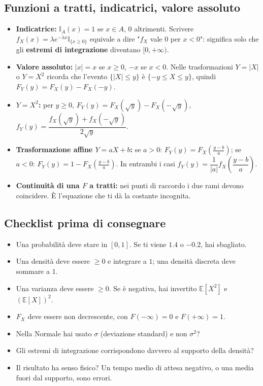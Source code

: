 \documentclass[12pt]{extarticle} %
\begin{document}
\subsection{Funzioni a tratti, indicatrici, valore assoluto}
\begin{itemize}
    \item \textbf{Indicatrice:} $\mathbb{I}_A(x) = 1$ se $x\in A$, $0$ altrimenti. Scrivere $f_X(x)=\lambda e^{-\lambda x}\mathbb{I}_{\{x\ge 0\}}$ equivale a dire "$f_X$ vale $0$ per $x<0$": significa solo che gli \textbf{estremi di integrazione} diventano $[0,+\infty)$.
    \item \textbf{Valore assoluto:} $|x| = x$ se $x\ge 0$, $-x$ se $x<0$. Nelle trasformazioni $Y=|X|$ o $Y=X^2$ ricorda che l'evento $\{|X|\le y\}$ è $\{-y \le X \le y\}$, quindi $F_Y(y)=F_X(y)-F_X(-y)$.
    \item \textbf{$Y = X^2$:} per $y\ge 0$, $F_Y(y) = F_X(\sqrt{y}) - F_X(-\sqrt{y})$, \; $f_Y(y) = \dfrac{f_X(\sqrt y)+f_X(-\sqrt y)}{2\sqrt y}$.
    \item \textbf{Trasformazione affine $Y = aX+b$:} se $a>0$: $F_Y(y)=F_X\!\left(\frac{y-b}{a}\right)$; se $a<0$: $F_Y(y)=1-F_X\!\left(\frac{y-b}{a}\right)$. In entrambi i casi $f_Y(y)=\dfrac{1}{|a|}f_X\!\left(\dfrac{y-b}{a}\right)$.
    \item \textbf{Continuità di una $F$ a tratti:} nei punti di raccordo i due rami devono coincidere. {\footnotesize È l'equazione che ti dà la costante incognita.}
\end{itemize}

\subsection{Checklist prima di consegnare}
\begin{itemize}
    \item Una probabilità deve stare in $[0,1]$. Se ti viene $1.4$ o $-0.2$, hai sbagliato.
    \item Una densità deve essere $\ge 0$ e integrare a $1$; una densità discreta deve sommare a $1$.
    \item Una varianza deve essere $\ge 0$. Se è negativa, hai invertito $\mathbb{E}[X^2]$ e $(\mathbb{E}[X])^2$.
    \item $F_X$ deve essere non decrescente, con $F(-\infty)=0$ e $F(+\infty)=1$.
    \item Nella Normale hai usato $\sigma$ (deviazione standard) e non $\sigma^2$?
    \item Gli estremi di integrazione corrispondono davvero al supporto della densità?
    \item Il risultato ha senso fisico? {\footnotesize Un tempo medio di attesa negativo, o una media fuori dal supporto, sono errori.}
\end{itemize}
\end{document}
